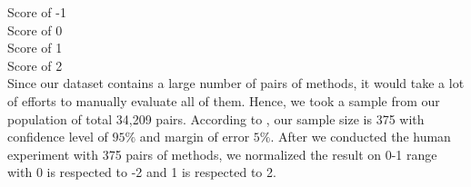 Score of -1 \\
Score of 0 \\
Score of 1 \\
Score of 2 \\

Since our dataset contains a large number of pairs of methods, it would take a lot of efforts to manually evaluate all of them. Hence, we took a sample from our population of total 34,209 pairs. According to \cite{website}, our sample size is 375 with confidence level of $95\%$ and margin of error $5\%$. After we conducted the human experiment with 375 pairs of methods, we normalized the result on 0-1 range with 0 is respected to -2 and 1 is respected to 2. 
